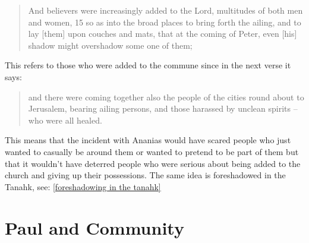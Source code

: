\documentclass[11pt]{article}
\begin{document}
\begin{quote}
And believers were increasingly added to the Lord, multitudes of both men and women, 15 so as into the broad places to bring forth the ailing, and to lay [them] upon couches and mats, that at the coming of Peter, even [his] shadow might overshadow some one of them;
\end{quote}
 This refers to those who were added to the commune since in the next verse it says: 
\begin{quote}
and there were coming together also the people of the cities round about to Jerusalem, bearing ailing persons, and those harassed by unclean spirits -- who were all healed.
\end{quote}
This means that the incident with Ananias would have scared people who just wanted to casually be around them or wanted to pretend to be part of them but that it wouldn't have deterred people who were serious about being added to the church and giving up their possessions. The same idea is foreshadowed in the Tanahk, see: \ref{foreshadowing in the tanahk}

\section{Paul and Community}
\end{document}
